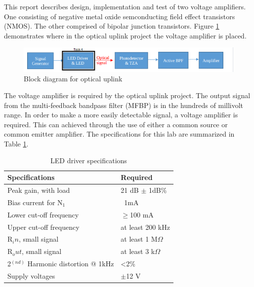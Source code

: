 




\noindent This report describes design, implementation and test of two voltage amplifiers. One consisting of negative metal oxide semconducting field effect transistors (NMOS). The other comprised of bipolar junction transistors. Figure \ref{fig:blockdiagram2} demonstrates where in the optical uplink project the voltage amplifier is placed. 



\begin{figure}[H]
    \centering
    \includegraphics[width=.9\textwidth ]{Introduction/Block_Diagram_MFBP.png}
    \caption{Block diagram for optical uplink \cite{b1}}
    \label{fig:blockdiagram2}
\end{figure}

The voltage amplifier is required by the optical uplink project. The output signal from the multi-feedback bandpass filter (MFBP) is in the hundreds of millivolt range. In order to make a more easily detectable signal, a voltage amplifier is required. This can achieved through the use of either a common source or common emitter amplifier. The specifications for this lab are summarized in Table \ref{tab:specifications}.

\begin{table}[H]
	\centering
	\caption{LED driver specifications}
	\label{tab:specifications}
	\begin{tabular}{|l|l|}
		\hline
		Specifications & Required       \\ \hline
		Peak gain, with load      & 21 dB $\pm$ 1dB\% \\ \hline
		Bias current for N$_1$     & ~1mA          \\ \hline
		Lower cut-off frequency      & $\geq$100 mA    \\ \hline
		Upper cut-off frequency    &  at least 200 kHz \\ \hline
		R$_in$, small signal       &  at least 1 M$\Omega$ \\ \hline
		R$_out$, small signal      &  at least 3 k$\Omega$ \\ \hline
		2$^(nd)$ Harmonic distortion @ 1kHz  & <2\% \\ \hline
		Supply voltages            &  $\pm$12 V
	\end{tabular}
\end{table}


